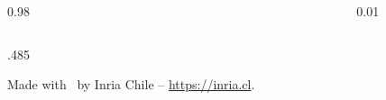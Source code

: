 \documentclass[final,svgnames,english]{beamer}
\begin{document}
\begin{frame}[fragile]{}
\begin{columns}[T]
\begin{column}{0.98\linewidth}
\begin{columns}[T]
\begin{column}{.485\linewidth}
          \begin{plainblock}{}
            \centering
            Made with \faHeart\ by Inria Chile -- \url{https://inria.cl}.
          \end{plainblock}
        \end{column}
      \end{columns}
    \end{column}

    \begin{column}{0.01\linewidth}
    \end{column}
  \end{columns}
\end{frame}
\end{document}
